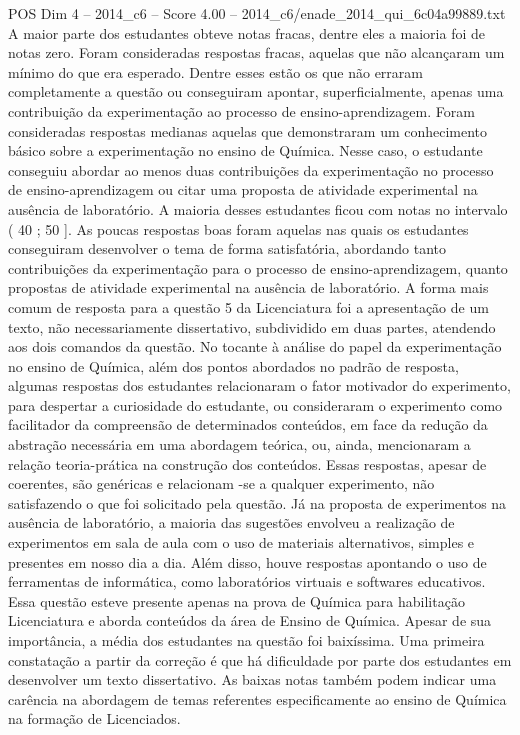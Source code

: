 \begin{textsample}{POS Dim 4 – 2014\_c6 – Score 4.00 – 2014\_c6/enade\_2014\_qui\_6c04a99889.txt}
A maior parte dos estudantes obteve notas fracas, dentre eles a maioria foi de notas zero.
Foram consideradas respostas fracas, aquelas que não alcançaram um mínimo do que era esperado.
Dentre esses estão os que não erraram completamente a questão ou conseguiram apontar, superficialmente, apenas uma contribuição da experimentação ao processo de ensino-aprendizagem.
Foram consideradas respostas medianas aquelas que demonstraram um conhecimento básico sobre a experimentação no ensino de Química.
Nesse caso, o estudante conseguiu abordar ao menos duas contribuições da experimentação no processo de ensino-aprendizagem ou citar uma proposta de atividade experimental na ausência de laboratório.
A maioria desses estudantes ficou com notas no intervalo ( 40 ; 50 ].
As poucas respostas boas foram aquelas nas quais os estudantes conseguiram desenvolver o tema de forma satisfatória, abordando tanto contribuições da experimentação para o processo de ensino-aprendizagem, quanto propostas de atividade experimental na ausência de laboratório.
A forma mais comum de resposta para a questão 5 da Licenciatura foi a apresentação de um texto, não necessariamente dissertativo, subdividido em duas partes, atendendo aos dois comandos da questão.
No tocante à análise do papel da experimentação no ensino de Química, além dos pontos abordados no padrão de resposta, algumas respostas dos estudantes relacionaram o fator motivador do experimento, para despertar a curiosidade do estudante, ou consideraram o experimento como facilitador da compreensão de determinados conteúdos, em face da redução da abstração necessária em uma abordagem teórica, ou, ainda, mencionaram a relação teoria-prática na construção dos conteúdos.
Essas respostas, apesar de coerentes, são genéricas e relacionam -se a qualquer experimento, não satisfazendo o que foi solicitado pela questão.
Já na proposta de experimentos na ausência de laboratório, a maioria das sugestões envolveu a realização de experimentos em sala de aula com o uso de materiais alternativos, simples e presentes em nosso dia a dia.
Além disso, houve respostas apontando o uso de ferramentas de informática, como laboratórios virtuais e softwares educativos.
Essa questão esteve presente apenas na prova de Química para habilitação Licenciatura e aborda conteúdos da área de Ensino de Química.
Apesar de sua importância, a média dos estudantes na questão foi baixíssima.
Uma primeira constatação a partir da correção é que há dificuldade por parte dos estudantes em desenvolver um texto dissertativo.
As baixas notas também podem indicar uma carência na abordagem de temas referentes especificamente ao ensino de Química na formação de Licenciados.

\end{textsample}
